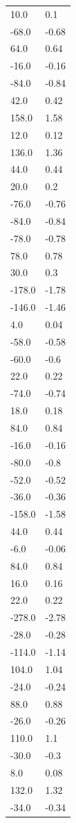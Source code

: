 \begin{longtable}{ll}
10.0 & 0.1 \\
-68.0 & -0.68 \\
64.0 & 0.64 \\
-16.0 & -0.16 \\
-84.0 & -0.84 \\
42.0 & 0.42 \\
158.0 & 1.58 \\
12.0 & 0.12 \\
136.0 & 1.36 \\
44.0 & 0.44 \\
20.0 & 0.2 \\
-76.0 & -0.76 \\
-84.0 & -0.84 \\
-78.0 & -0.78 \\
78.0 & 0.78 \\
30.0 & 0.3 \\
-178.0 & -1.78 \\
-146.0 & -1.46 \\
4.0 & 0.04 \\
-58.0 & -0.58 \\
-60.0 & -0.6 \\
22.0 & 0.22 \\
-74.0 & -0.74 \\
18.0 & 0.18 \\
84.0 & 0.84 \\
-16.0 & -0.16 \\
-80.0 & -0.8 \\
-52.0 & -0.52 \\
-36.0 & -0.36 \\
-158.0 & -1.58 \\
44.0 & 0.44 \\
-6.0 & -0.06 \\
84.0 & 0.84 \\
16.0 & 0.16 \\
22.0 & 0.22 \\
-278.0 & -2.78 \\
-28.0 & -0.28 \\
-114.0 & -1.14 \\
104.0 & 1.04 \\
-24.0 & -0.24 \\
88.0 & 0.88 \\
-26.0 & -0.26 \\
110.0 & 1.1 \\
-30.0 & -0.3 \\
8.0 & 0.08 \\
132.0 & 1.32 \\
-34.0 & -0.34 \\

\end{longtable}
